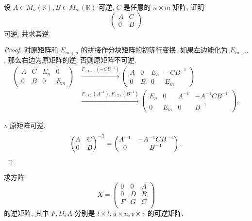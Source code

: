\documentclass[color=black,device=normal,lang=cn,mode=geye]{elegantnote}
\begin{document}
\begin{exercisec}[第 3 章的习题 3.9]
    设 $A\in M_n(\mathbb{R}),B\in M_m(\mathbb{R})$ 可逆, $C$ 是任意的 $n\times m$ 矩阵, 证明
    \[\begin{pmatrix}
        A & C \\
        0 & B
    \end{pmatrix}\]
    可逆, 并求其逆.
\end{exercisec}
\begin{proof}
    对原矩阵和 $E_{m+n}$ 的拼接作分块矩阵的初等行变换, 如果左边能化为 $E_{m+n}$, 那么右边为原矩阵的逆, 否则原矩阵不可逆.
    \begin{align*}
        \left(\begin{array}{cc|cc}
            A & C & E_n & 0 \\
            0 & B & 0 & E_m
        \end{array}\right) & \xrightarrow{F_{(1,2)}(-CB^{-1})}\left(\begin{array}{cc|cc}
            A & 0 & E_n & -CB^{-1} \\
            0 & B & 0 & E_m
        \end{array}\right) \\
        & \xrightarrow{F_{(1)}(A^{-1}),F_{(2)}(B^{-1})}\left(\begin{array}{cc|cc}
            E_n & 0 & A^{-1} & -A^{-1}CB^{-1} \\
            0 & E_m & 0 & B^{-1}
        \end{array}\right),
    \end{align*}

    $\therefore$ 原矩阵可逆,
    \[\begin{pmatrix}
        A & C \\
        0 & B
    \end{pmatrix}^{-1}=\begin{pmatrix}
        A^{-1} & -A^{-1}CB^{-1} \\
        0 & B^{-1}
    \end{pmatrix}.\qedhere\]
\end{proof}
\begin{exercisec}[3.4.7(2)]
    求方阵
    \[X=\begin{pmatrix}
        0 & 0 & A \\
        0 & D & B \\
        F & G & C \\
    \end{pmatrix}\]
    的逆矩阵, 其中 $F,D,A$ 分别是 $t\times t,u\times u,v\times v$ 的可逆矩阵.
\end{exercisec}
\end{document}
